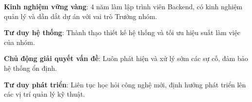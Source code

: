 

\begin{cvbullets}
  \item {\textbf{Kinh nghiệm vững vàng}: 4 năm làm lập trình viên Backend, có kinh nghiệm quản lý và dẫn dắt dự án với vai trò Trưởng nhóm.}
  \item {\textbf{Tư duy hệ thống}: Thành thạo thiết kế hệ thống và tối ưu hiệu suất làm việc của nhóm.}
  \item {\textbf{Chủ động giải quyết vấn đề}: Luôn phát hiện và xử lý sớm các sự cố, đảm bảo hệ thống ổn định.}
  \item {\textbf{Tư duy phát triển}: Liên tục học hỏi công nghệ mới, định hướng phát triển lên các vị trí quản lý kỹ thuật.}
\end{cvbullets}

